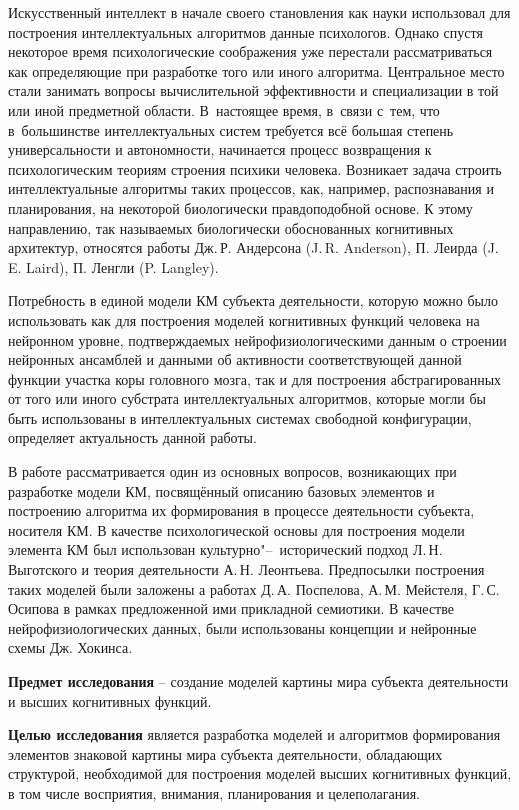 Искусственный интеллект в начале своего становления как науки использовал для построения интеллектуальных алгоритмов данные психологов. Однако спустя некоторое время психологические соображения уже перестали рассматриваться как определяющие при разработке того или иного алгоритма. Центральное место стали занимать вопросы вычислительной эффективности и специализации в той или иной предметной области. В~настоящее время, в~связи с~тем, что в~большинстве интеллектуальных систем требуется всё большая степень универсальности и автономности, начинается процесс возвращения к психологическим теориям строения психики человека. Возникает задача строить интеллектуальные алгоритмы таких процессов, как, например, распознавания и планирования, на некоторой биологически правдоподобной основе. К этому направлению, так называемых биологически обоснованных когнитивных архитектур, относятся работы Дж.\,Р. Андерсона (J.\,R. Anderson), П. Леирда (J.\,E. Laird), П. Ленгли (P. Langley).

Потребность в единой модели КМ субъекта деятельности, которую можно было использовать как для построения моделей когнитивных функций человека на нейронном уровне, подтверждаемых нейрофизиологическими данным о строении нейронных ансамблей и данными об активности соответствующей данной функции участка коры головного мозга, так и для построения абстрагированных от того или иного субстрата интеллектуальных алгоритмов, которые могли бы быть использованы в интеллектуальных системах свободной конфигурации, определяет актуальность данной работы.

В работе рассматривается один из основных вопросов, возникающих при разработке модели КМ, посвящённый описанию базовых элементов и построению алгоритма их формирования в процессе деятельности субъекта, носителя КМ. В качестве психологической основы для построения модели элемента КМ был использован культурно"--~исторический подход Л.\,Н. Выготского и теория деятельности А.\,Н. Леонтьева. Предпосылки построения таких моделей были заложены а работах Д.\,А. Поспелова, А.\,М. Мейстеля, Г.\,С. Осипова в рамках предложенной ими прикладной семиотики. В качестве нейрофизиологических данных, были использованы концепции и нейронные схемы Дж. Хокинса.

\textbf{Предмет исследования} -- создание моделей картины мира субъекта деятельности и высших когнитивных функций.

\textbf{Целью исследования} является разработка моделей и алгоритмов формирования элементов знаковой картины мира субъекта деятельности, обладающих структурой, необходимой для построения моделей высших когнитивных функций, в том числе восприятия, внимания, планирования и целеполагания.

